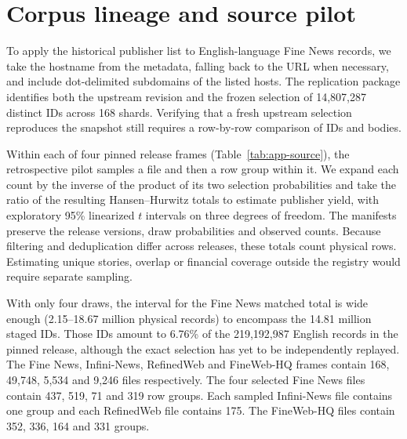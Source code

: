 \setcounter{table}{0}
\renewcommand{\thetable}{A\arabic{table}}

\section{Corpus lineage and source pilot}

To apply the historical publisher list to English-language Fine News
records, we take the hostname from the metadata, falling back to the URL
when necessary, and include dot-delimited subdomains of the listed hosts.
The replication package identifies both the upstream revision and the
frozen selection of 14,807,287 distinct IDs across 168 shards. Verifying
that a fresh upstream selection reproduces the snapshot still requires
a row-by-row comparison of IDs and bodies.

Within each of four pinned release frames (Table~\ref{tab:app-source}),
the retrospective pilot samples a file and then a row group within it.
We expand each count by the inverse of the product of its two selection
probabilities and take the ratio of the resulting Hansen--Hurwitz totals
to estimate publisher yield, with exploratory 95\% linearized $t$
intervals on three degrees of freedom. The manifests preserve the release
versions, draw probabilities and observed counts. Because filtering and
deduplication differ across releases, these totals count physical rows.
Estimating unique stories, overlap or financial coverage outside the
registry would require separate sampling.

With only four draws, the interval for the Fine News matched total is
wide enough (2.15--18.67 million physical records) to encompass the
14.81 million staged IDs. Those IDs amount to 6.76\% of the
219,192,987 English records in the pinned release, although the exact
selection has yet to be independently replayed.
The Fine News, Infini-News, RefinedWeb and FineWeb-HQ frames contain
168, 49,748, 5,534 and 9,246 files respectively. The four selected
Fine News files contain 437, 519, 71 and 319 row groups. Each sampled
Infini-News file contains one group and each RefinedWeb file contains
175. The FineWeb-HQ files contain 352, 336, 164 and 331 groups.

